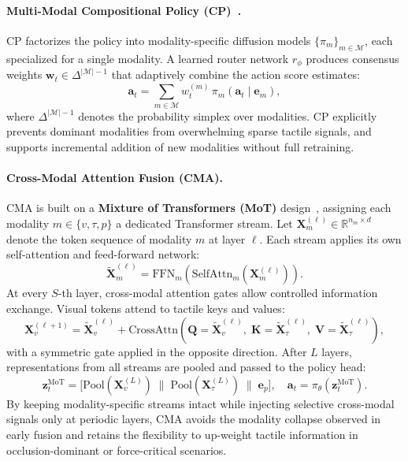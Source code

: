 \documentclass{article}
\begin{document}
\paragraph{Multi-Modal Compositional Policy (CP)~\citep{chen2025consensus}.}
CP factorizes the policy into modality-specific diffusion models $\{\pi_m\}_{m \in \mathcal{M}}$, each specialized for a single modality. A learned router network $r_\phi$ produces consensus weights $\mathbf{w}_t \in \Delta^{|\mathcal{M}|-1}$ that adaptively combine the action score estimates:
\begin{equation}
    \mathbf{a}_t = \sum_{m \in \mathcal{M}} w_t^{(m)}\,
    \pi_m\!\left(\mathbf{a}_t \mid \mathbf{e}_m\right),
\end{equation}
where $\Delta^{|\mathcal{M}|-1}$ denotes the probability simplex over modalities. CP explicitly prevents dominant modalities from overwhelming sparse tactile signals, and supports incremental addition of new modalities without full retraining.
 
\paragraph{Cross-Modal Attention Fusion (CMA).}
CMA is built on a \textbf{Mixture of Transformers (MoT)} design~\citep{bao2023mot}, assigning each modality $m \in \{v, \tau, p\}$ a dedicated Transformer stream. Let $\mathbf{X}_m^{(\ell)} \in \mathbb{R}^{n_m \times d}$ denote the token sequence of modality $m$ at layer $\ell$. Each stream applies its own self-attention and feed-forward network:
\begin{equation}
    \tilde{\mathbf{X}}_m^{(\ell)}
    = \mathrm{FFN}_m\!\left(\mathrm{SelfAttn}_m\!\left(
    \mathbf{X}_m^{(\ell)}\right)\right).
\end{equation}
At every $S$-th layer, cross-modal attention gates allow controlled information exchange. Visual tokens attend to tactile keys and values:
\begin{equation}
    \mathbf{X}_v^{(\ell+1)}
    = \tilde{\mathbf{X}}_v^{(\ell)}
    + \mathrm{CrossAttn}\!\left(
        \mathbf{Q} = \tilde{\mathbf{X}}_v^{(\ell)},\;
        \mathbf{K} = \tilde{\mathbf{X}}_\tau^{(\ell)},\;
        \mathbf{V} = \tilde{\mathbf{X}}_\tau^{(\ell)}
    \right),
\end{equation}
with a symmetric gate applied in the opposite direction. After $L$ layers, representations from all streams are pooled and passed to the policy head:
\begin{equation}
    \mathbf{z}_t^{\mathrm{MoT}} =
    \bigl[\mathrm{Pool}(\mathbf{X}_v^{(L)}) \;\|\;
    \mathrm{Pool}(\mathbf{X}_\tau^{(L)}) \;\|\; \mathbf{e}_p\bigr],
    \quad \mathbf{a}_t = \pi_\theta\!\left(\mathbf{z}_t^{\mathrm{MoT}}\right).
\end{equation}
By keeping modality-specific streams intact while injecting selective cross-modal signals only at periodic layers, CMA avoids the modality collapse observed in early fusion and retains the flexibility to up-weight tactile information in occlusion-dominant or force-critical scenarios.
\end{document}
